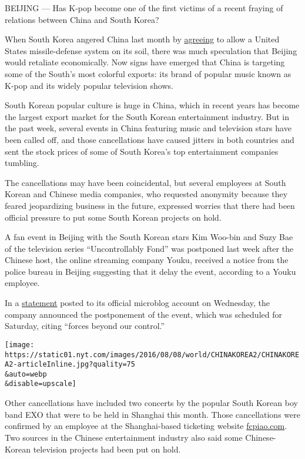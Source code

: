 BEIJING --- Has K-pop become one of the first victims of a recent
fraying of relations between China and South Korea?

When South Korea angered China last month by
\href{http://www.nytimes.com/2016/07/08/world/asia/south-korea-and-us-agree-to-deploy-missile-defense-system.html?_r=0}{agreeing}
to allow a United States missile-defense system on its soil, there was
much speculation that Beijing would retaliate economically. Now signs
have emerged that China is targeting some of the South's most colorful
exports: its brand of popular music known as K-pop and its widely
popular television shows.

South Korean popular culture is huge in China, which in recent years has
become the largest export market for the South Korean entertainment
industry. But in the past week, several events in China featuring music
and television stars have been called off, and those cancellations have
caused jitters in both countries and sent the stock prices of some of
South Korea's top entertainment companies tumbling.

The cancellations may have been coincidental, but several employees at
South Korean and Chinese media companies, who requested anonymity
because they feared jeopardizing business in the future, expressed
worries that there had been official pressure to put some South Korean
projects on hold.

A fan event in Beijing with the South Korean stars Kim Woo-bin and Suzy
Bae of the television series ``Uncontrollably Fond'' was postponed last
week after the Chinese host, the online streaming company Youku,
received a notice from the police bureau in Beijing suggesting that it
delay the event, according to a Youku employee.

In a
\href{http://weibo.com/1642904381/E1QOp4Dg4?from=page_1002061642904381_profile\&wvr=6\&mod=weibotime\&type=comment\#_rnd1470372650398}{statement}
posted to its official microblog account on Wednesday, the company
announced the postponement of the event, which was scheduled for
Saturday, citing ``forces beyond our control.''

\texttt{[image: https://static01.nyt.com/images/2016/08/08/world/CHINAKOREA2/CHINAKOREA2-articleInline.jpg?quality=75\\\&auto=webp\\\&disable=upscale]}

Other cancellations have included two concerts by the popular South
Korean boy band EXO that were to be held in Shanghai this month. Those
cancellations were confirmed by an employee at the Shanghai-based
ticketing website \href{http://fcpiao.com/}{fcpiao.com}. Two sources in
the Chinese entertainment industry also said some Chinese-Korean
television projects had been put on hold.

